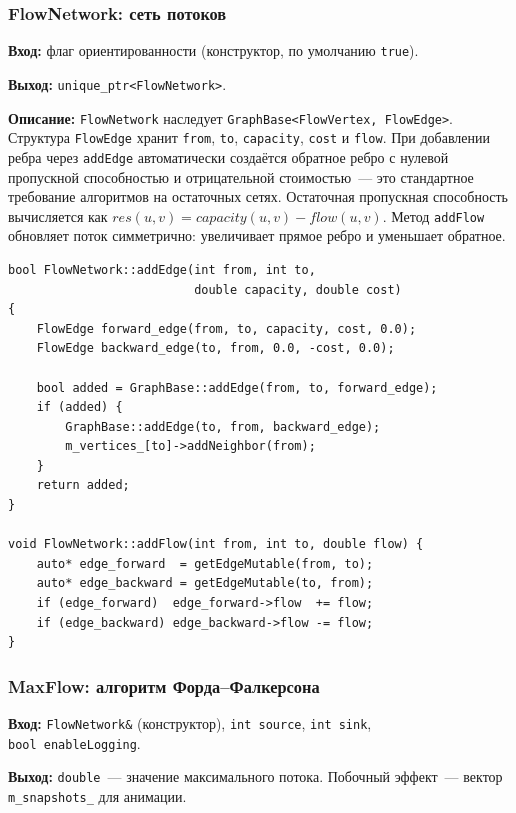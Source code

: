 \subsubsection{FlowNetwork: сеть потоков}

\textbf{Вход:} флаг ориентированности (конструктор, по умолчанию
\texttt{true}).

\textbf{Выход:} \texttt{unique\_ptr<FlowNetwork>}.

\textbf{Описание:} \texttt{FlowNetwork} наследует
\texttt{GraphBase<FlowVertex, FlowEdge>}. Структура \texttt{FlowEdge}
хранит \texttt{from}, \texttt{to}, \texttt{capacity}, \texttt{cost}
и \texttt{flow}. При добавлении ребра через \texttt{addEdge}
автоматически создаётся обратное ребро с нулевой пропускной
способностью и отрицательной стоимостью~--- это стандартное
требование алгоритмов на остаточных сетях.
Остаточная пропускная способность вычисляется как
$\mathit{res}(u,v) = \mathit{capacity}(u,v) - \mathit{flow}(u,v)$.
Метод \texttt{addFlow} обновляет поток симметрично: увеличивает
прямое ребро и уменьшает обратное.

\begin{lstlisting}[style=cppstyle, caption={Добавление ребра и обратного ребра (FlowNetwork.cc)}]
bool FlowNetwork::addEdge(int from, int to,
                          double capacity, double cost)
{
    FlowEdge forward_edge(from, to, capacity, cost, 0.0);
    FlowEdge backward_edge(to, from, 0.0, -cost, 0.0);

    bool added = GraphBase::addEdge(from, to, forward_edge);
    if (added) {
        GraphBase::addEdge(to, from, backward_edge);
        m_vertices_[to]->addNeighbor(from);
    }
    return added;
}

void FlowNetwork::addFlow(int from, int to, double flow) {
    auto* edge_forward  = getEdgeMutable(from, to);
    auto* edge_backward = getEdgeMutable(to, from);
    if (edge_forward)  edge_forward->flow  += flow;
    if (edge_backward) edge_backward->flow -= flow;
}
\end{lstlisting}

\subsubsection{MaxFlow: алгоритм Форда--Фалкерсона}

\textbf{Вход:} \texttt{FlowNetwork\&} (конструктор), \texttt{int source},
\texttt{int sink}, \\ \texttt{bool enableLogging}.

\textbf{Выход:} \texttt{double}~--- значение максимального потока.
Побочный эффект~--- вектор \texttt{m\_snapshots\_} для анимации.


